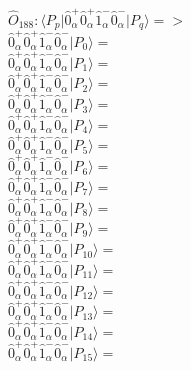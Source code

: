 \documentclass[14pt]{article}
\begin{document}
    $\hat{O}_{188}:  \langle{P_p}\vert \hat{0}_{\alpha}^{+}\hat{0}_{\alpha}^{+}\hat{1}_{\alpha}^{-}\hat{0}_{\alpha}^{-} \vert{P_q}\rangle => $ \\ 
    $ \hat{0}_{\alpha}^{+}\hat{0}_{\alpha}^{+}\hat{1}_{\alpha}^{-}\hat{0}_{\alpha}^{-} \vert{P_{0}}\rangle =  $ \\ 
    $ \hat{0}_{\alpha}^{+}\hat{0}_{\alpha}^{+}\hat{1}_{\alpha}^{-}\hat{0}_{\alpha}^{-} \vert{P_{1}}\rangle =  $ \\ 
    $ \hat{0}_{\alpha}^{+}\hat{0}_{\alpha}^{+}\hat{1}_{\alpha}^{-}\hat{0}_{\alpha}^{-} \vert{P_{2}}\rangle =  $ \\ 
    $ \hat{0}_{\alpha}^{+}\hat{0}_{\alpha}^{+}\hat{1}_{\alpha}^{-}\hat{0}_{\alpha}^{-} \vert{P_{3}}\rangle =  $ \\ 
    $ \hat{0}_{\alpha}^{+}\hat{0}_{\alpha}^{+}\hat{1}_{\alpha}^{-}\hat{0}_{\alpha}^{-} \vert{P_{4}}\rangle =  $ \\ 
    $ \hat{0}_{\alpha}^{+}\hat{0}_{\alpha}^{+}\hat{1}_{\alpha}^{-}\hat{0}_{\alpha}^{-} \vert{P_{5}}\rangle =  $ \\ 
    $ \hat{0}_{\alpha}^{+}\hat{0}_{\alpha}^{+}\hat{1}_{\alpha}^{-}\hat{0}_{\alpha}^{-} \vert{P_{6}}\rangle =  $ \\ 
    $ \hat{0}_{\alpha}^{+}\hat{0}_{\alpha}^{+}\hat{1}_{\alpha}^{-}\hat{0}_{\alpha}^{-} \vert{P_{7}}\rangle =  $ \\ 
    $ \hat{0}_{\alpha}^{+}\hat{0}_{\alpha}^{+}\hat{1}_{\alpha}^{-}\hat{0}_{\alpha}^{-} \vert{P_{8}}\rangle =  $ \\ 
    $ \hat{0}_{\alpha}^{+}\hat{0}_{\alpha}^{+}\hat{1}_{\alpha}^{-}\hat{0}_{\alpha}^{-} \vert{P_{9}}\rangle =  $ \\ 
    $ \hat{0}_{\alpha}^{+}\hat{0}_{\alpha}^{+}\hat{1}_{\alpha}^{-}\hat{0}_{\alpha}^{-} \vert{P_{10}}\rangle =  $ \\ 
    $ \hat{0}_{\alpha}^{+}\hat{0}_{\alpha}^{+}\hat{1}_{\alpha}^{-}\hat{0}_{\alpha}^{-} \vert{P_{11}}\rangle =  $ \\ 
    $ \hat{0}_{\alpha}^{+}\hat{0}_{\alpha}^{+}\hat{1}_{\alpha}^{-}\hat{0}_{\alpha}^{-} \vert{P_{12}}\rangle =  $ \\ 
    $ \hat{0}_{\alpha}^{+}\hat{0}_{\alpha}^{+}\hat{1}_{\alpha}^{-}\hat{0}_{\alpha}^{-} \vert{P_{13}}\rangle =  $ \\ 
    $ \hat{0}_{\alpha}^{+}\hat{0}_{\alpha}^{+}\hat{1}_{\alpha}^{-}\hat{0}_{\alpha}^{-} \vert{P_{14}}\rangle =  $ \\ 
    $ \hat{0}_{\alpha}^{+}\hat{0}_{\alpha}^{+}\hat{1}_{\alpha}^{-}\hat{0}_{\alpha}^{-} \vert{P_{15}}\rangle =  $ \\ 
    
\end{document}
